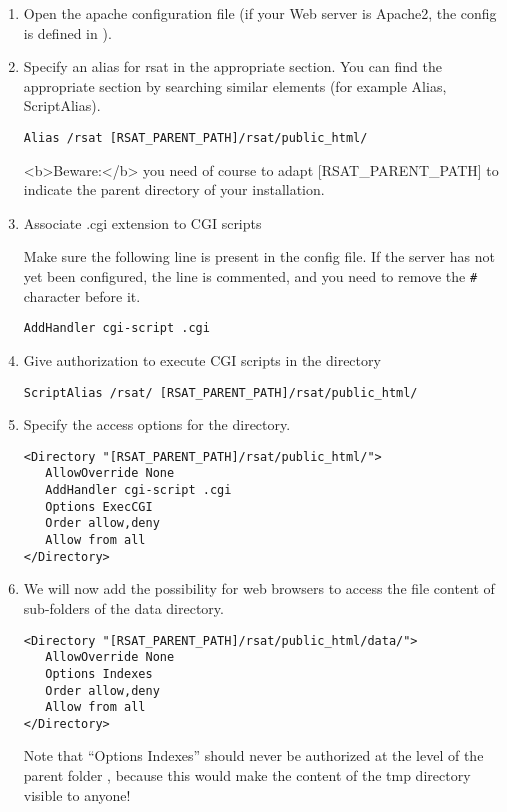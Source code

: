 \documentclass[12pt,a4paper, twoside]{scrreprt} %
\begin{document}
\begin{enumerate}
\item Open the apache configuration file (if your Web server is
  Apache2, the config is defined in ).

\item Specify an alias for rsat in the appropriate section. You
  can find the appropriate section by searching similar elements (for
  example Alias, ScriptAlias).

\begin{lstlisting}
Alias /rsat [RSAT_PARENT_PATH]/rsat/public_html/
\end{lstlisting}

<b>Beware:</b> you need of course to adapt [RSAT\_PARENT\_PATH] to
indicate the parent directory of your \RSAT installation.

\item Associate .cgi extension to CGI scripts

Make sure the following line is present in the config file. If the
server has not yet been configured, the line is commented, and you
need to remove the \texttt{\#} character before it.

\begin{lstlisting}
AddHandler cgi-script .cgi
\end{lstlisting}

\item Give authorization to execute CGI scripts in the \RSAT directory

\begin{lstlisting}
ScriptAlias /rsat/ [RSAT_PARENT_PATH]/rsat/public_html/
\end{lstlisting}

\item Specify the access options for the \RSAT directory.

\begin{lstlisting}
<Directory "[RSAT_PARENT_PATH]/rsat/public_html/">
   AllowOverride None
   AddHandler cgi-script .cgi
   Options ExecCGI
   Order allow,deny
   Allow from all
</Directory>
\end{lstlisting}

\item We will now add the possibility for web browsers to access the file
  content of sub-folders of the data directory. 


\begin{lstlisting}
<Directory "[RSAT_PARENT_PATH]/rsat/public_html/data/">
   AllowOverride None
   Options Indexes
   Order allow,deny
   Allow from all
</Directory>
\end{lstlisting}

  Note that ``Options Indexes'' should never be authorized at the level of the
  parent folder , because this would make the content of the tmp
  directory visible to anyone!

\end{enumerate}
\end{document}
